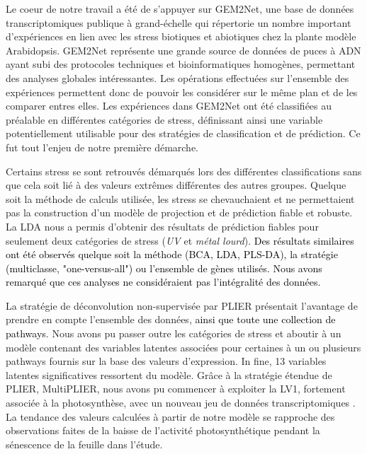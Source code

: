 \documentclass[twoside]{article}
\newcommand{\AR}[1]{\textcolor{black}{#1}}
\begin{document}
\vspace{0.5cm}Le coeur de notre travail a été de s'appuyer sur GEM2Net, une base de données transcriptomiques publique à grand-échelle qui répertorie un nombre important d'expériences en lien avec les stress biotiques et abiotiques chez la plante modèle Arabidopsis. GEM2Net représente une grande source de données de puces à ADN ayant subi des protocoles techniques et bioinformatiques homogènes, permettant des analyses globales intéressantes. Les opérations effectuées sur l'ensemble des expériences permettent donc de pouvoir les considérer sur le même plan et de les comparer entres elles. Les expériences dans GEM2Net ont été classifiées au préalable en différentes catégories de stress, définissant ainsi une variable potentiellement utilisable pour des stratégies de classification et de prédiction. Ce fut tout l'enjeu de notre première démarche.

\vspace{0.5cm}Certains stress se sont retrouvés démarqués lors des différentes classifications sans que cela soit lié à des valeurs extrêmes différentes des autres groupes. Quelque soit la méthode de calculs utilisée, les stress se chevauchaient et ne permettaient pas la construction d'un modèle de projection et de prédiction fiable et robuste. La LDA nous a permis d'obtenir des résultats de prédiction fiables pour seulement deux catégories de stress (\textit{UV} et \textit{métal lourd}). \AR{Des résultats similaires ont été observés quelque soit la méthode (BCA, LDA, PLS-DA), la stratégie (multiclasse, "one-versus-all") ou l'ensemble de gènes utilisés. Nous avons remarqué que ces analyses ne considéraient pas l'intégralité des données.}

\vspace{0.5cm}La stratégie de déconvolution non-supervisée par PLIER présentait l'avantage de prendre en compte l'ensemble des données, \AR{ainsi que toute une collection de pathways}. Nous avons pu passer outre les catégories de stress et aboutir à un modèle contenant des variables latentes associées pour certaines à un ou plusieurs pathways fournis sur la base des valeurs d'expression. In fine, 13 variables latentes significatives ressortent du modèle. Grâce à la stratégie étendue de PLIER, MultiPLIER, nous avons pu commencer à exploiter la LV1, fortement associée à la photosynthèse, avec un nouveau jeu de données transcriptomiques \cite{breeze_high-resolution_2011}. La tendance des valeurs calculées à partir de notre modèle se rapproche des observations faites de la baisse de l'activité photosynthétique pendant la sénescence de la feuille dans l'étude.
\end{document}
